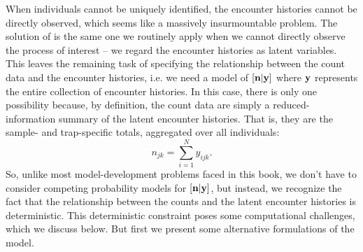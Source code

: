 When individuals cannot be uniquely identified, the encounter histories cannot
be directly observed, which seems like a massively insurmountable
problem. The solution of \citet{chandler_royle:2012} is the same one we routinely apply when we
cannot directly observe the process of interest -- we regard the
encounter histories as latent variables. This leaves the remaining
task of specifying the relationship between the count data and
the encounter histories, i.e. we need a model of $[{\bf n}|{\bf y}]$
where $\bf y$ represents the entire collection of encounter
histories. In this case, there is only one possibility because, by
definition, the count data are simply a
reduced-information summary of the latent encounter histories. That
is, they are the sample- and trap-specific totals, aggregated over all
individuals:
\begin{equation}
n_{jk} = \sum_{i=1}^{N} y_{ijk}.
\label{unmarked.eq.ny}
\end{equation}
So, unlike most model-development problems faced in this book, we
don't have to consider competing probability models for
$[{\bf n}|{\bf y}]$, but instead, we recognize the fact that the
relationship between the counts and the latent encounter histories is
deterministic. This deterministic constraint poses some computational
challenges, which we discuss below. But first we present some
alternative formulations of the model.


